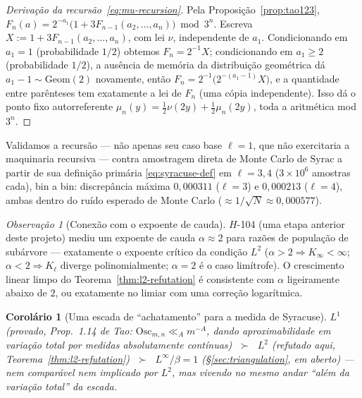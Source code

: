 \documentclass[11pt]{article}
\newtheorem{corollary}[theorem]{Corolário}
\theoremstyle{definition}
\theoremstyle{remark}
\newtheorem{remark}[theorem]{Observação}
\begin{document}
\begin{proof}[Derivação da recursão~\eqref{eq:mu-recursion}]
Pela Proposição~\ref{prop:tao123}, $F_n(a) =
2^{-a_1}\bigl(1+3F_{n-1}(a_2,\dots,a_n)\bigr)\bmod 3^n$. Escreva
$X:=1+3F_{n-1}(a_2,\dots,a_n)$, com lei $\nu$, independente de $a_1$.
Condicionando em $a_1=1$ (probabilidade $1/2$) obtemos $F_n = 2^{-1}X$;
condicionando em $a_1\ge 2$ (probabilidade $1/2$), a ausência de
memória da distribuição geométrica dá $a_1-1\sim\mathrm{Geom}(2)$
novamente, então $F_n = 2^{-1}\bigl(2^{-(a_1-1)}X\bigr)$, e a
quantidade entre parênteses tem exatamente a lei de $F_n$ (uma cópia
independente). Isso dá o ponto fixo autorreferente $\mu_n(y) =
\tfrac12\nu(2y) + \tfrac12\mu_n(2y)$, toda a aritmética mod $3^n$.
\end{proof}

Validamos a recursão --- não apenas seu caso base $\ell=1$, que não
exercitaria a maquinaria recursiva --- contra amostragem direta de
Monte Carlo de $\mathrm{Syrac}$ a partir de sua definição primária
\eqref{eq:syracuse-def} em $\ell=3,4$ ($3\times10^6$ amostras cada),
bin a bin: discrepância máxima $0{,}000311$ ($\ell=3$) e $0{,}000213$
($\ell=4$), ambas dentro do ruído esperado de Monte Carlo
($\approx 1/\sqrt{N}\approx 0{,}000577$).

\begin{remark}[Conexão com o expoente de cauda]
$H$-104 (uma etapa anterior deste projeto) mediu um expoente de cauda
$\alpha\approx 2$ para razões de população de subárvore --- exatamente
o expoente crítico da condição $L^2$ ($\alpha>2\Rightarrow
K_\infty<\infty$; $\alpha<2\Rightarrow K_\ell$ diverge
polinomialmente; $\alpha=2$ é o caso limítrofe). O crescimento linear
limpo do Teorema~\ref{thm:l2-refutation} é consistente com $\alpha$
ligeiramente abaixo de $2$, ou exatamente no limiar com uma correção
logarítmica.
\end{remark}

\begin{corollary}[Uma escada de ``achatamento'' para a medida de
Syracuse]\label{cor:flatness-ladder}
$L^1$ (provado, Prop.~1.14 de Tao: $\mathrm{Osc}_{m,n}\ll_A m^{-A}$,
dando aproximabilidade em variação total por medidas absolutamente
contínuas) $\;\succ\;$ $L^2$ (refutado aqui,
Teorema~\ref{thm:l2-refutation}) $\;\succ\;$ $L^\infty/\beta=1$
(\S\ref{sec:triangulation}, em aberto) --- nem comparável nem
implicado por $L^2$, mas vivendo no mesmo andar ``além da variação
total'' da escada.
\end{corollary}
\end{document}

